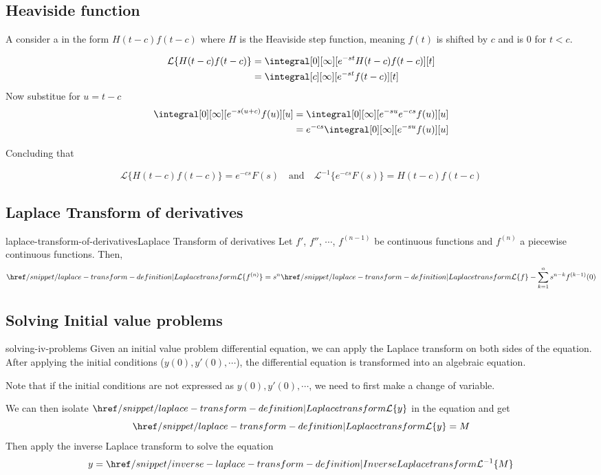 \documentclass[preview]{standalone}
\begin{document}
\subsection{Heaviside function}


A consider a \function in the form \(H(t-c)f(t-c)\) where \(H\) is the
Heaviside step function, meaning \(f(t)\) is shifted by \(c\) and is \(0\) for \(t < c\).

\begin{align*}
    \mathcal{L}\{H(t-c)f(t-c)\} &=
    \integral[0][\infty][e^{-st}H(t-c)f(t-c)][t] \\
    &= \integral[c][\infty][e^{-st}f(t-c)][t]
\end{align*}
Now substitue for \(u=t-c\)
\begin{align*}
    \integral[0][\infty][e^{-s(u+c)}f(u)][u]
    &= \integral[0][\infty][e^{-su}e^{-cs}f(u)][u] \\
    &= e^{-cs} \integral[0][\infty][e^{-su}f(u)][u]
\end{align*}

Concluding that

\[
    \mathcal{L}\{H(t-c)f(t-c)\} =
    e^{-cs}F(s)
    \quad
    \text{and}
    \quad
    {\mathcal{L}}^{-1}\{e^{-cs}F(s)\} =
    H(t-c)f(t-c)
\]

\subsection{Laplace Transform of derivatives}

\begin{snippettheorem}{laplace-transform-of-derivatives}{Laplace Transform of derivatives}
    Let \(f'\), \(f''\), \(\cdots\), \(f^{(n-1)}\) be continuous functions
    and \(f^{(n)}\) a piecewise continuous functions. Then,
    \[
        \laplacetf\{f^{(n)}\} =
        s^n \laplacetf\{f\} -
        \sum_{k=1}^n s^{n-k}f^{(k-1)}(0)
    \]
\end{snippettheorem}

\subsection{Solving Initial value problems}

\begin{snippet}{solving-iv-problems}
Given an initial value problem differential equation, we can apply the Laplace
transform on both sides of the equation. After applying the initial conditions
(\(y(0), y'(0), \cdots\)), the differential equation is transformed into an algebraic equation.

Note that if the initial conditions are not expressed as  \(y(0), y'(0), \cdots\),
we need to first make a change of variable.

We can then isolate \(\laplacetf\{y\}\) in the equation and get
\[
    \laplacetf\{y\} = M
\]
Then apply the inverse Laplace transform to solve the equation
\[
    y=\invlaplacetf\{M\}
\]
\end{snippet}

\end{document}
